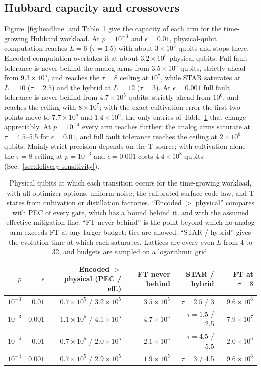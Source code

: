 \documentclass[11pt]{article}
\newcommand{\eps}{\epsilon}
\begin{document}
\subsection{Hubbard capacity and crossovers}\label{sec:capacity}
Figure~\ref{fig:headline} and Table~\ref{tab:crossovers} give the capacity of
each arm for the time-growing Hubbard workload. At $p=10^{-3}$ and $\eps=0.01$,
physical-qubit computation reaches $L=6$ ($\tau=1.5$) with about
$3\times10^3$ qubits and stops there. Encoded computation overtakes it at about
$3.2\times10^5$ physical qubits. Full fault tolerance is never behind the analog
arms from $3.5\times10^5$ qubits, strictly ahead from $9.3\times10^5$, and reaches the
$\tau=8$ ceiling at $10^7$, while STAR saturates at $L=10$ ($\tau=2.5$) and
the hybrid at $L=12$ ($\tau=3$). At $\eps=0.001$ full fault tolerance is never
behind from $4.7\times10^5$ qubits, strictly ahead from $10^6$, and reaches
the ceiling with $8\times10^7$; with the exact cultivation error the first two points
move to $7.7\times10^5$ and $1.4\times10^6$, the only entries of
Table~\ref{tab:crossovers} that change appreciably. At $p=10^{-4}$ every arm reaches further: the
analog arms saturate at $\tau=4.5$--5.5 for $\eps=0.01$, and full fault
tolerance reaches the ceiling at $2\times10^6$ qubits. Mainly strict precision
depends on the T source; with cultivation alone the $\tau=8$ ceiling at
$p=10^{-3}$ and $\eps=0.001$ costs $4.4\times10^8$ qubits
(Sec.~\ref{sec:delivery-sensitivity}).

\begin{table}[!htbp]
\centering
\small
\begin{tabular}{@{}rrrrrr@{}}
\toprule
$p$ & $\eps$ & Encoded $>$ physical (PEC / eff.) & FT never behind & STAR / hybrid & FT at $\tau=8$\\
\midrule
$10^{-3}$ & $0.01$ & $0.7\times10^5$ / $3.2\times10^5$ & $3.5\times10^5$ & $\tau=2.5$ / 3 & $9.6\times10^6$\\
$10^{-3}$ & $0.001$ & $1.1\times10^5$ / $4.1\times10^5$ & $4.7\times10^5$ & $\tau=1.5$ / 2.5 & $7.9\times10^7$\\
$10^{-4}$ & $0.01$ & $0.7\times10^5$ / $2.0\times10^5$ & $2.1\times10^5$ & $\tau=4.5$ / 5.5 & $2.0\times10^6$\\
$10^{-4}$ & $0.001$ & $0.7\times10^5$ / $2.9\times10^5$ & $1.9\times10^5$ & $\tau=3$ / 4.5 & $9.6\times10^6$\\
\bottomrule
\end{tabular}
\caption{Physical qubits at which each transition occurs for the time-growing
workload, with all optimizer options, uniform noise, the calibrated surface-code law, and T
states from cultivation or distillation factories.
``Encoded $>$ physical'' compares with PEC of every gate, which has a bound behind it,
and with the assumed effective mitigation line. ``FT never behind'' is the
point beyond which no analog arm exceeds FT at any larger budget; ties are
allowed. ``STAR / hybrid'' gives the evolution time at which each saturates. Lattices are
every even $L$ from 4 to 32, and budgets are sampled on a logarithmic grid.}\label{tab:crossovers}
\end{table}
\end{document}
